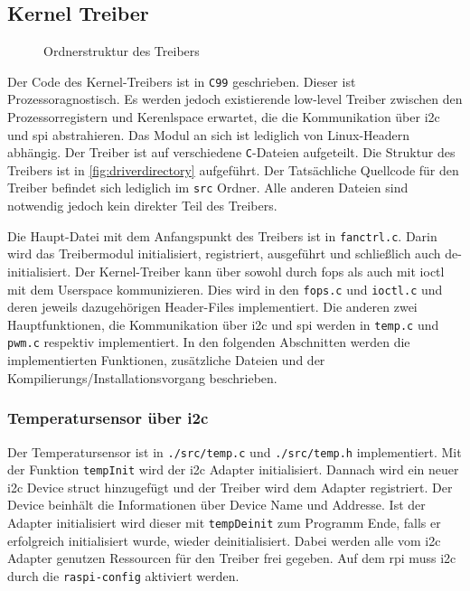 \subsection{Kernel Treiber}

\begin{wrapfigure}[25]{o}[1cm]{8cm}
\caption{Ordnerstruktur des Treibers}
\label{fig:driverdirectory}
\end{wrapfigure}

Der Code des Kernel-Treibers ist in \texttt{C99} geschrieben.
Dieser ist Prozessoragnostisch.
Es werden jedoch existierende low-level Treiber zwischen den Prozessorregistern und Kerenlspace erwartet, die die Kommunikation über \gls{i2c} und \gls{spi} abstrahieren.
Das Modul an sich ist lediglich von Linux-Headern abhängig.
Der Treiber ist auf verschiedene \texttt{C}-Dateien aufgeteilt.
Die Struktur des Treibers ist in \autoref{fig:driverdirectory} aufgeführt.
Der Tatsächliche Quellcode für den Treiber befindet sich lediglich im \texttt{src} Ordner.
Alle anderen Dateien sind notwendig jedoch kein direkter Teil des Treibers.

Die Haupt-Datei mit dem Anfangspunkt des Treibers ist in \texttt{fanctrl.c}.
Darin wird das Treibermodul initialisiert, registriert, ausgeführt und schließlich auch de-initialisiert.
Der Kernel-Treiber kann über sowohl durch \gls{fops} als auch mit \gls{ioctl} mit dem Userspace kommunizieren.
Dies wird in den \texttt{fops.c} und \texttt{ioctl.c} und deren jeweils dazugehörigen Header-Files implementiert.
Die anderen zwei Hauptfunktionen, die Kommunikation über \gls{i2c} und \gls{spi} werden in \texttt{temp.c} und \texttt{pwm.c} respektiv implementiert.
In den folgenden Abschnitten werden die implementierten Funktionen, zusätzliche Dateien und der Kompilierungs/Installationsvorgang beschrieben.

\subsubsection{Temperatursensor über \acrshort{i2c}}

Der Temperatursensor ist in \texttt{./src/temp.c} und \texttt{./src/temp.h} implementiert.
Mit der Funktion \texttt{tempInit} wird der \gls{i2c} Adapter initialisiert.
Dannach wird ein neuer \gls{i2c} Device struct hinzugefügt und der Treiber wird dem Adapter registriert.
Der Device beinhält die Informationen über Device Name und Addresse.
Ist der Adapter initialisiert wird dieser mit \texttt{tempDeinit} zum Programm Ende, falls er erfolgreich initialisiert wurde, wieder deinitialisiert.
Dabei werden alle vom \gls{i2c} Adapter genutzen Ressourcen für den Treiber frei gegeben.
Auf dem \gls{rpi} muss \gls{i2c} durch die \texttt{raspi-config} aktiviert werden.

